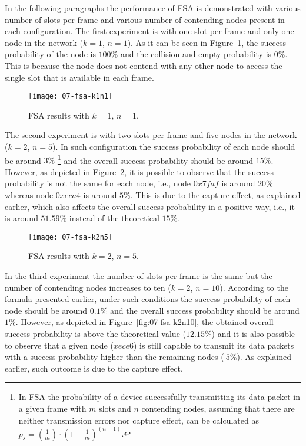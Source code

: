 In the following paragraphs the performance of FSA is demonstrated with various number of slots per frame and various number of contending nodes present in each configuration. The first experiment is with one slot per frame and only one node in the network ($k=1$, $n=1$). As it can be seen in Figure~\ref{fig:07-fsa-k1n1}, the success probability of the node is $100\%$ and the collision and empty probability is $0\%$. This is because the node does not contend with any other node to access the single slot that is available in each frame.

\begin{figure}[!ht]
    \centering
	\texttt{[image: 07-fsa-k1n1]}
    \caption{FSA results with $k=1$, $n=1$.}
    \label{fig:07-fsa-k1n1}
\end{figure}

The second experiment is with two slots per frame and five nodes in the network ($k=2$, $n=5$). In such configuration the success probability of each node should be around $3\%$ \footnote{In FSA the probability of a device successfully transmitting its data packet in a given frame with $m$ slots and $n$ contending nodes, assuming that there are neither transmission errors nor capture effect, can be calculated as $p_{s} = (\frac{1}{m}) \cdot (1 - \frac{1}{m})^{(n - 1)}$.} and the overall success probability should be around $15\%$. However, as depicted in Figure~\ref{fig:07-fsa-k2n5}, it is possible to observe that the success probability is not the same for each node, i.e., node $0x7faf$ is around $20\%$ whereas node $0xeca4$ is around $5\%$. This is due to the capture effect, as explained earlier, which also affects the overall success probability in a positive way, i.e., it is around $51.59\%$ instead of the theoretical $15\%$.

\begin{figure}[!ht]
    \centering
	\texttt{[image: 07-fsa-k2n5]}
    \caption{FSA results with $k=2$, $n=5$.}
    \label{fig:07-fsa-k2n5}
\end{figure}

In the third experiment the number of slots per frame is the same but the number of contending nodes increases to ten ($k=2$, $n=10$). According to the formula presented earlier, under such conditions the success probability of each node should be around $0.1\%$ and the overall success probability should be around $1\%$. However, as depicted in Figure~\ref{fig:07-fsa-k2n10}, the obtained overall success probability is above the theoretical value ($12.15\%$) and it is also possible to observe that a given node ($xece6$) is still capable to transmit its data packets with a success probability higher than the remaining nodes ($~5\%$). As explained earlier, such outcome is due to the capture effect.


